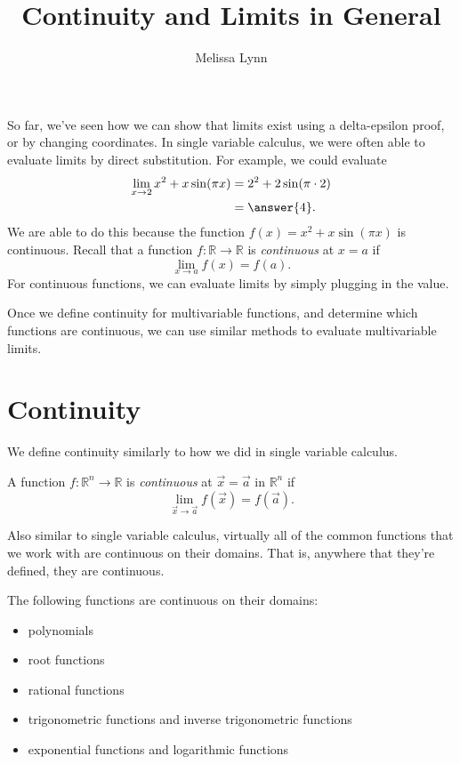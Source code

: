 \documentclass{ximera}
\title{Continuity and Limits in General}
\author{Melissa Lynn}
\begin{document}
\begin{abstract}
\end{abstract}
\maketitle

So far, we've seen how we can show that limits exist using a delta-epsilon proof, or by changing coordinates. In single variable calculus, we were often able to evaluate limits by direct substitution. For example, we could evaluate
\begin{align*}
\lim_{x\rightarrow 2} x^2+x\sin(\pi x) &= 2^2 + 2\sin(\pi \cdot 2)\\
&= \answer{4}. 
\end{align*}
We are able to do this because the function $f(x) = x^2+x\sin(\pi x)$ is continuous. Recall that a function $f:\mathbb{R}\rightarrow \mathbb{R}$ is \emph{continuous} at $x=a$ if
\[
\lim_{x\rightarrow a}f(x) = f(a).
\]
For continuous functions, we can evaluate limits by simply plugging in the value.

Once we define continuity for multivariable functions, and determine which functions are continuous, we can use similar methods to evaluate multivariable limits.

\section*{Continuity}

We define continuity similarly to how we did in single variable calculus.

\begin{definition}
A function $f:\mathbb{R}^n\rightarrow\mathbb{R}$ is \emph{continuous} at $\vec{x}=\vec{a}$ in $\mathbb{R}^n$ if
\[
\lim_{\vec{x}\rightarrow\vec{a}}f(\vec{x}) = f(\vec{a}).
\]
\end{definition}

Also similar to single variable calculus, virtually all of the common functions that we work with are continuous on their domains. That is, anywhere that they're defined, they are continuous.

\begin{theorem}
The following functions are continuous on their domains:
\begin{itemize}
\item polynomials
\item root functions
\item rational functions
\item trigonometric functions and inverse trigonometric functions
\item exponential functions and logarithmic functions
\end{itemize}
\end{theorem}
\end{document}
